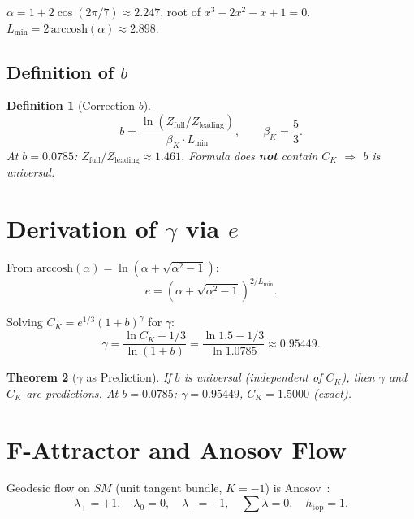 \documentclass[11pt,a4paper]{article}
\newtheorem{theorem}{Theorem}[section]
\newtheorem{definition}[theorem]{Definition}
\begin{document}
$\alpha = 1 + 2\cos(2\pi/7) \approx 2.247$, root of $x^3 - 2x^2 - x + 1 = 0$. $L_{\min} = 2\,\mathrm{arccosh}(\alpha) \approx 2.898$.

\subsection{Definition of $b$}

\begin{definition}[Correction $b$]
\begin{equation}
b = \frac{\ln(Z_{\mathrm{full}}/Z_{\mathrm{leading}})}{\beta_K \cdot L_{\min}}, \qquad \beta_K = \frac{5}{3}.
\end{equation}
At $b = 0.0785$: $Z_{\mathrm{full}}/Z_{\mathrm{leading}} \approx 1.461$. Formula does \textbf{not} contain $C_K$ $\Rightarrow$ $b$ is universal.
\end{definition}

\section{Derivation of $\gamma$ via $e$}

From $\mathrm{arccosh}(\alpha) = \ln(\alpha + \sqrt{\alpha^2-1})$:
\begin{equation}
e = (\alpha + \sqrt{\alpha^2-1})^{2/L_{\min}}.
\end{equation}

Solving $C_K = e^{1/3}(1+b)^\gamma$ for $\gamma$:
\begin{equation}
\gamma = \frac{\ln C_K - 1/3}{\ln(1+b)} = \frac{\ln 1.5 - 1/3}{\ln 1.0785} \approx 0.95449.
\end{equation}

\begin{theorem}[$\gamma$ as Prediction]
If $b$ is universal (independent of $C_K$), then $\gamma$ and $C_K$ are predictions. At $b = 0.0785$: $\gamma = 0.95449$, $C_K = 1.5000$ (exact).
\end{theorem}

\section{F-Attractor and Anosov Flow}

Geodesic flow on $SM$ (unit tangent bundle, $K = -1$) is Anosov~\cite{anosov1967}:
\begin{equation}
\lambda_+ = +1, \quad \lambda_0 = 0, \quad \lambda_- = -1, \quad \sum\lambda = 0, \quad h_{\mathrm{top}} = 1.
\end{equation}
\end{document}
